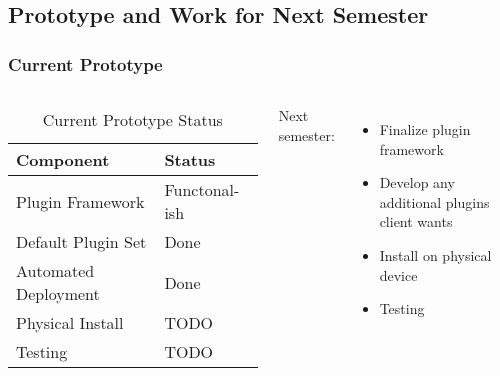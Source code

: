\subsection{Prototype and Work for Next Semester}
\begin{frame}
\frametitle{Current Prototype}

\begin{columns}[c]


\begin{table}
\begin{tabular}{l l}
\toprule
\textbf{Component} & \textbf{Status}  \\
\midrule
Plugin Framework & Functonal-ish \\
Default Plugin Set & Done \\
Automated Deployment & Done \\
Physical Install & TODO \\
Testing & TODO \\
\bottomrule                                                                   
\end{tabular}
\caption{Current Prototype Status}
\end{table}

Next semester:
\begin{itemize}
    \item Finalize plugin framework
    \item Develop any additional plugins client wants
    \item Install on physical device
    \item Testing
\end{itemize}
\end{columns}

\end{frame}
